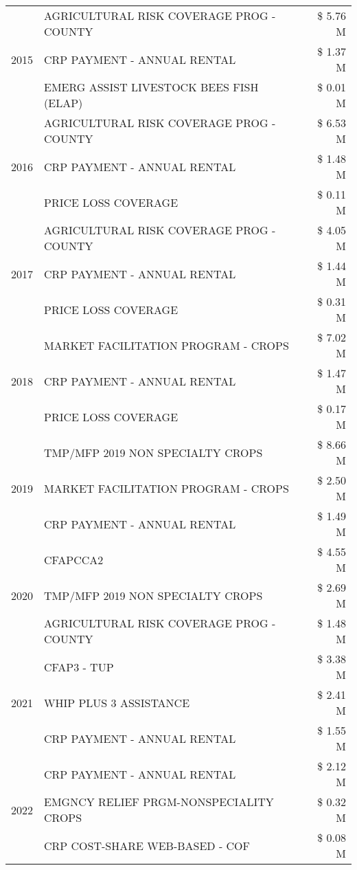 \begin{tabular}{llr}
\cline{1-3}
\multirow[t]{3}{*}{2015} & AGRICULTURAL RISK COVERAGE PROG - COUNTY & \$ 5.76 M \\
 & CRP PAYMENT - ANNUAL RENTAL & \$ 1.37 M \\
 & EMERG ASSIST LIVESTOCK BEES FISH (ELAP) & \$ 0.01 M \\
\cline{1-3}
\multirow[t]{3}{*}{2016} & AGRICULTURAL RISK COVERAGE PROG - COUNTY & \$ 6.53 M \\
 & CRP PAYMENT - ANNUAL RENTAL & \$ 1.48 M \\
 & PRICE LOSS COVERAGE & \$ 0.11 M \\
\cline{1-3}
\multirow[t]{3}{*}{2017} & AGRICULTURAL RISK COVERAGE PROG - COUNTY & \$ 4.05 M \\
 & CRP PAYMENT - ANNUAL RENTAL & \$ 1.44 M \\
 & PRICE LOSS COVERAGE & \$ 0.31 M \\
\cline{1-3}
\multirow[t]{3}{*}{2018} & MARKET FACILITATION PROGRAM - CROPS & \$ 7.02 M \\
 & CRP PAYMENT - ANNUAL RENTAL & \$ 1.47 M \\
 & PRICE LOSS COVERAGE & \$ 0.17 M \\
\cline{1-3}
\multirow[t]{3}{*}{2019} & TMP/MFP 2019 NON SPECIALTY CROPS & \$ 8.66 M \\
 & MARKET FACILITATION PROGRAM - CROPS & \$ 2.50 M \\
 & CRP PAYMENT - ANNUAL RENTAL & \$ 1.49 M \\
\cline{1-3}
\multirow[t]{3}{*}{2020} & CFAPCCA2 & \$ 4.55 M \\
 & TMP/MFP 2019 NON SPECIALTY CROPS & \$ 2.69 M \\
 & AGRICULTURAL RISK COVERAGE PROG - COUNTY & \$ 1.48 M \\
\cline{1-3}
\multirow[t]{3}{*}{2021} & CFAP3 - TUP & \$ 3.38 M \\
 & WHIP PLUS 3 ASSISTANCE & \$ 2.41 M \\
 & CRP PAYMENT - ANNUAL RENTAL & \$ 1.55 M \\
\cline{1-3}
\multirow[t]{3}{*}{2022} & CRP PAYMENT - ANNUAL RENTAL & \$ 2.12 M \\
 & EMGNCY RELIEF PRGM-NONSPECIALITY CROPS & \$ 0.32 M \\
 & CRP COST-SHARE WEB-BASED - COF & \$ 0.08 M \\
\cline{1-3}
\bottomrule
\end{tabular}
